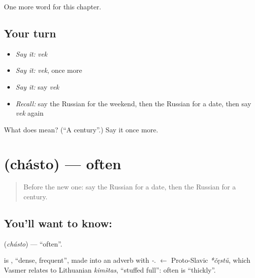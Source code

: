 \begin{grammarlens}[title={What you've built}]
One more word for this chapter.
\end{grammarlens}

\subsection*{Your turn}
\begin{itemize}
\raggedright
  \item \emph{Say it:} \emph{vek}
  \item \emph{Say it:} \emph{vek}, once more
  \item \emph{Say it:} say \emph{vek}
  \item \emph{Recall:} say the Russian for the weekend, then the Russian for a date, then say \emph{vek} again
\end{itemize}

\begin{tcolorbox}[breakable,colback=teal!4,colframe=teal!35!black,title={Before you move on}]
What does  mean? (\textquotedblleft{}A century\textquotedblright{}.) Say it once more.
\end{tcolorbox}
\section[\texorpdfstring{\ru{часто} (chásto)}{часто (chásto)}]{ (chásto) — often}

\label{lesson:RU-C85-often}



\begin{quote}
Before the new one: say the Russian for a date, then the Russian for a century.
\end{quote}

\subsection*{You'll want to know: }
\textbf{} (\emph{chásto}) — \textquotedblleft{}often\textquotedblright{}.

\begin{cousinweb}
\textbf{} is \emph{}, \textquotedblleft{}dense, frequent\textquotedblright{}, made into an adverb with \emph{-}. \emph{} $\leftarrow$ Proto-Slavic \emph{*čęstŭ}, which Vasmer relates to Lithuanian \emph{kimštas}, \textquotedblleft{}stuffed full\textquotedblright{}: often is \textquotedblleft{}thickly\textquotedblright{}.
\end{cousinweb}

